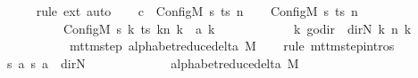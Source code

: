 \begin{isabellebody}
\ \ \ \ \isamarkupfalse%
\ {\isacharparenleft}{\kern0pt}rule\ ext{\isacharparenright}{\kern0pt}\ auto\isanewline
\ \ \isamarkupfalse%
\ {\isacharquery}{\kern0pt}c{\isacharprime}{\kern0pt}{\isacharprime}{\kern0pt}\ {\isacharequal}{\kern0pt}\ {\isachardoublequoteopen}Config\isactrlsub M\ {\isacharquery}{\kern0pt}s{\isacharprime}{\kern0pt}\ ts\ n{\isachardoublequoteclose}\isanewline
\ \ \isamarkupfalse%
\ {\isachardoublequoteopen}{\isacharparenleft}{\kern0pt}Config\isactrlsub M\ {\isacharquery}{\kern0pt}s\ ts\ n{\isacharcomma}{\kern0pt}\isanewline
\ \ \ \ \ \ \ \ \ \ Config\isactrlsub M\ {\isacharquery}{\kern0pt}s{\isacharprime}{\kern0pt}\ {\isacharparenleft}{\kern0pt}{\isasymlambda}k{\isachardot}{\kern0pt}\ {\isacharparenleft}{\kern0pt}ts\ k{\isacharparenright}{\kern0pt}{\isacharparenleft}{\kern0pt}n\ k\ {\isacharcolon}{\kern0pt}{\isacharequal}{\kern0pt}\ {\isacharquery}{\kern0pt}a\ k{\isacharparenright}{\kern0pt}{\isacharparenright}{\kern0pt}\isanewline
\ \ \ \ \ \ \ \ \ \ \ \ {\isacharparenleft}{\kern0pt}{\isasymlambda}k{\isachardot}{\kern0pt}\ go{\isacharunderscore}{\kern0pt}dir\ {\isacharparenleft}{\kern0pt}{\isacharparenleft}{\kern0pt}{\isasymlambda}{\isacharunderscore}{\kern0pt}{\isachardot}{\kern0pt}\ dir{\isachardot}{\kern0pt}N{\isacharparenright}{\kern0pt}\ k{\isacharparenright}{\kern0pt}\ {\isacharparenleft}{\kern0pt}n\ k{\isacharparenright}{\kern0pt}{\isacharparenright}{\kern0pt}{\isacharparenright}{\kern0pt}\isanewline
\ \ \ \ \ \ \ \ \ \ {\isasymin}\ mttm{\isacharunderscore}{\kern0pt}step\ {\isacharparenleft}{\kern0pt}alphabet{\isacharunderscore}{\kern0pt}reduce{\isacharunderscore}{\kern0pt}delta\ M{\isacharparenright}{\kern0pt}{\isachardoublequoteclose}\isanewline
\ \ \isamarkupfalse%
\ {\isacharparenleft}{\kern0pt}rule\ mttm{\isacharunderscore}{\kern0pt}step{\isachardot}{\kern0pt}intros{\isacharparenright}{\kern0pt}\isanewline
\ \ \ \ \isamarkupfalse%
\ {\isachardoublequoteopen}{\isacharparenleft}{\kern0pt}{\isacharquery}{\kern0pt}s{\isacharcomma}{\kern0pt}\ {\isacharquery}{\kern0pt}a{\isacharcomma}{\kern0pt}\ {\isacharquery}{\kern0pt}s{\isacharprime}{\kern0pt}{\isacharcomma}{\kern0pt}\ {\isacharquery}{\kern0pt}a{\isacharcomma}{\kern0pt}\ {\isacharparenleft}{\kern0pt}{\isasymlambda}{\isacharunderscore}{\kern0pt}{\isachardot}{\kern0pt}\ dir{\isachardot}{\kern0pt}N{\isacharparenright}{\kern0pt}{\isacharparenright}{\kern0pt}\isanewline
\ \ \ \ \ \ \ \ \ \ \ \ {\isasymin}\ alphabet{\isacharunderscore}{\kern0pt}reduce{\isacharunderscore}{\kern0pt}delta\ M{\isachardoublequoteclose}\isanewline

\end{isabellebody}
